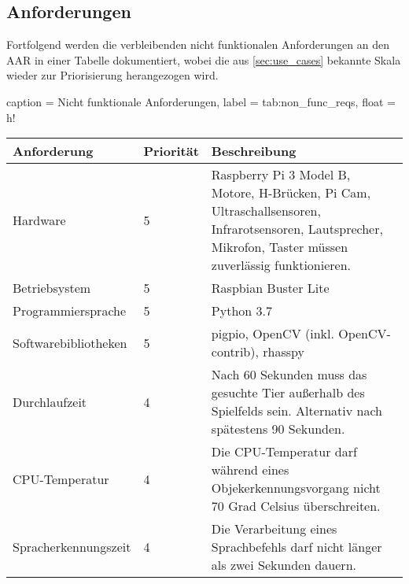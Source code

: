 \subsection{Anforderungen}

Fortfolgend werden die verbleibenden nicht funktionalen Anforderungen an den \ac{AAR} in einer Tabelle dokumentiert, wobei die aus \autoref{sec:use_cases} bekannte Skala wieder zur Priorisierung herangezogen wird.

\begin{dhbwtable}{%
    caption	= Nicht funktionale Anforderungen,
    label	= tab:non_func_reqs,
    float = h!
}
    \begin{tabularx}{\textwidth}{lXX}
        \toprule
        \textbf{Anforderung} & \textbf{Priorität} & \textbf{Beschreibung}  \\\midrule
        Hardware    &   5 & Raspberry Pi 3 Model B, Motore, H-Brücken, Pi Cam, Ultraschallsensoren, Infrarotsensoren, Lautsprecher, Mikrofon, Taster müssen zuverlässig funktionieren. \\
        Betriebsystem & 5 & Raspbian Buster Lite  \\
        Programmiersprache & 5 & Python 3.7 \\
        Softwarebibliotheken & 5 & pigpio, OpenCV (inkl. OpenCV-contrib), rhasspy \\
        Durchlaufzeit & 4 & Nach 60 Sekunden muss das gesuchte Tier außerhalb des Spielfelds sein. Alternativ nach spätestens 90 Sekunden. \\
        \ac{CPU}-Temperatur & 4 & Die \ac{CPU}-Temperatur darf während eines Objekerkennungsvorgang nicht 70 Grad Celsius überschreiten.\\
        Spracherkennungszeit & 4 & Die Verarbeitung eines Sprachbefehls darf nicht länger als zwei Sekunden dauern.
    \end{tabularx}    
\end{dhbwtable}